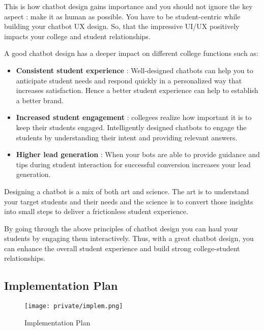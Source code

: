 \documentclass[14pt]{extarticle}
\begin{document}
This is how chatbot design gains importance and you should not ignore the key aspect : make it as human as possible. You have to be student-centric while building your chatbot UX design. So, that the impressive UI/UX positively impacts your college and student relationships.

A good chatbot design has a deeper impact on different college functions such as:
\begin{itemize}
    \item \textbf{Consistent student experience} : Well-designed chatbots can help you to anticipate student needs and respond quickly in a personalized way that increases satisfaction. Hence a better student experience can help to establish a better brand.
    \item \textbf{Increased student engagement} : collegees realize how important it is to keep their students engaged. Intelligently designed chatbots to engage the students by understanding their intent and providing relevant answers.
    \vspace{2em}
    \item \textbf{Higher lead generation} : When your bots are able to provide guidance and tips during student interaction for successful conversion increases your lead generation.
\end{itemize}

Designing a chatbot is a mix of both art and science. The art is to understand your target students and their needs and the science is to convert those insights into small steps to deliver a frictionless student experience.

By going through the above principles of chatbot design you can haul your students by engaging them interactively. Thus, with a great chatbot design, you can enhance the overall student experience and build strong college-student relationships.

\subsection{Implementation Plan}


\begin{figure}[!htb]
    \begin{center}
        \texttt{[image: private/implem.png]}
    \end{center}
    \caption{Implementation Plan}
\end{figure}
\end{document}
